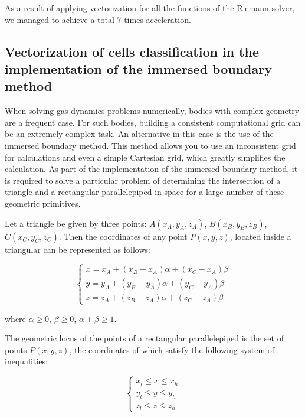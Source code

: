 \documentclass[
11pt,%
tightenlines,%
twoside,%
onecolumn,%
nofloats,%
nobibnotes,%
nofootinbib,%
superscriptaddress,%
noshowpacs,%
centertags]%
{revtex4}
\begin{document}
As a result of applying vectorization for all the functions of the Riemann solver, we managed to achieve a total 7 times acceleration.

\subsection{Vectorization of cells classification in the implementation of the immersed boundary method}

When solving gas dynamics problems numerically, bodies with complex geometry are a frequent case.
For such bodies, building a consistent computational grid can be an extremely complex task.
An alternative in this case is the use of the immersed boundary method.
This method allows you to use an inconsistent grid for calculations and even a simple Cartesian grid, which greatly simplifies the calculation.
As part of the implementation of the immersed boundary method, it is required to solve a particular problem of determining the intersection of a triangle and a rectangular parallelepiped in space for a large number of these geometric primitives.

Let a triangle be given by three points: $A(x_A, y_A, z_A)$, $B(x_B, y_B, z_B)$, $C(x_C, y_C, z_C)$.
Then the coordinates of any point $P(x, y, z)$, located inside a triangular can be represented as follows:

\begin{equation}
\begin{cases}
x = x_A + (x_B - x_A)\alpha + (x_C - x_A)\beta \\
y = y_A + (y_B - y_A)\alpha + (y_C - y_A)\beta \\
z = z_A + (z_B - z_A)\alpha + (z_C - z_A)\beta
\end{cases}
\end{equation}

where $\alpha \ge 0$, $\beta \ge 0$, $\alpha + \beta \ge 1$.

The geometric locus of the points of a rectangular parallelepiped is the set of points $P(x, y, z)$, the coordinates of which satisfy the following system of inequalities:

\begin{equation}
\begin{cases}
x_l \le x \le x_h \\
y_l \le y \le y_h \\
z_l \le z \le z_h
\end{cases}
\end{equation}
\end{document}
